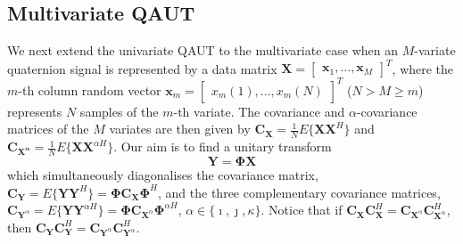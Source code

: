 \documentclass[review]{elsarticle}
\theoremstyle{plain}
\theoremstyle{remark}
\theoremstyle{plain}
\theoremstyle{definition}
\theoremstyle{prop}
\theoremstyle{definition}
\theoremstyle{plain}
\theoremstyle{plain}
\begin{document}
\subsection{Multivariate QAUT}
We next extend the univariate QAUT to the multivariate case when an $M$-variate quaternion signal is represented by a
data matrix
$\mathbf{X}=\left[\begin{array}{ccc}
\mathbf{x}_{1},\ldots,\mathbf{x}_{M}\end{array}\right]^{T}$, where the $m$-th column 
random vector $\mathbf{x}_m=\left[\begin{array}{ccc}x_{m}(1),\ldots,x_{m}(N)\end{array}\right]^{T}$ ($N>M\geq m$) represents $N$ samples of the $m$-th variate. The covariance and $\alpha$-covariance matrices of the $M$ variates are then given by $\mathbf{C}_\mathbf{X}=\frac{1}{N} E\{\mathbf{X}\mathbf{X}^{H}\}$ and
$\mathbf{C}_\mathbf{X^\alpha}=\frac{1}{N} E\{\mathbf{X}\mathbf{X}^{\alpha H}\}$. Our aim is to find a unitary transform
\begin{equation}
\mathbf{Y}=\mathbf{\Phi}\mathbf{X} \label{M-QAUT}
\end{equation}
which simultaneously diagonalises the covariance matrix, $\mathbf{C}_{\mathbf{Y}}=E\{\mathbf{Y}\mathbf{Y}^{H}\}=\mathbf{\Phi}\mathbf{C}_{\mathbf{X}}\mathbf{\Phi}^{H}$, and the three complementary covariance matrices, $\mathbf{C}_{\mathbf{Y}^\alpha}=E\{\mathbf{Y}\mathbf{Y}^{\alpha H}\}=\mathbf{\Phi}\mathbf{C}_{\mathbf{X}^\alpha}\mathbf{\Phi}^{\alpha H}$, $\alpha \in \{\imath,\jmath,\kappa\}$. Notice that if $\mathbf{C}_{\mathbf{X}}\mathbf{C}_{\mathbf{X}}^H=\mathbf{C}_{\mathbf{X}^\alpha}\mathbf{C}_{\mathbf{X}^\alpha}^H$, then $\mathbf{C}_{\mathbf{Y}}\mathbf{C}_{\mathbf{Y}}^H=\mathbf{C}_{\mathbf{Y}^\alpha}\mathbf{C}_{\mathbf{Y}^\alpha}^H$.  
\end{document}

